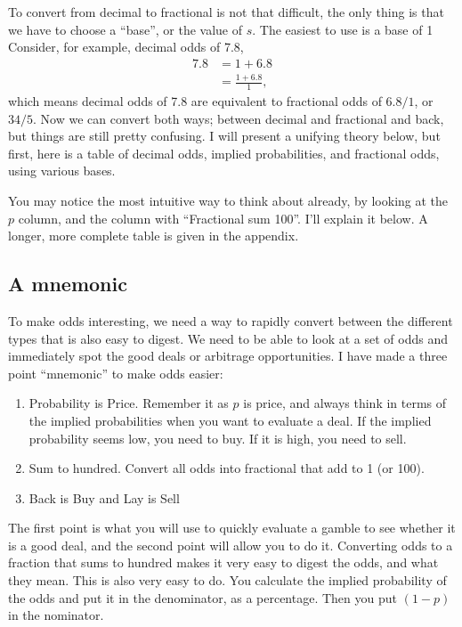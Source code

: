 \documentclass[a4paper]{article}
\begin{document}
To convert from decimal to fractional is not that difficult, the only thing is that we have to choose a ``base'', or the value of $s$.
The easiest to use is a base of 1
Consider, for example, decimal odds of 7.8,
\begin{align*}
 7.8 &=  1 + 6.8 \\
     &= \frac{1 + 6.8}{1}
     \text{,}
\end{align*}
which means decimal odds of 7.8 are equivalent to fractional odds of $6.8/1$, or $34/5$.
Now we can convert both ways; between decimal and fractional and back, but things are still pretty confusing.
I will present a unifying theory below, but first, here is a table of decimal odds, implied probabilities, and fractional odds, using various bases.

You may notice the most intuitive way to think about already, by looking at the $p$ column, and the column with ``Fractional sum 100''.
I'll explain it below.
A longer, more complete table is given in the appendix.


\subsection{A mnemonic}
To make odds interesting, we need a way to rapidly convert between the different types that is also easy to digest.
We need to be able to look at a set of odds and immediately spot the good deals or arbitrage opportunities.
I have made a three point ``mnemonic'' to make odds easier:


\begin{enumerate}
 \item Probability is Price.
 Remember it as $p$ is price, and always think in terms of the implied probabilities when you want to evaluate a deal. If the implied probability seems low, you need to buy. If it is high, you need to sell.
 \item Sum to hundred. Convert all odds into fractional that add to 1 (or 100).
 \item Back is Buy and Lay is Sell
\end{enumerate}

The first point is what you will use to quickly evaluate a gamble to see whether it is a good deal, and the second point will allow you to do it.
Converting odds to a fraction that sums to hundred makes it very easy to digest the odds, and what they mean.
This is also very easy to do. You calculate the implied probability of the odds and put it in the denominator, as a percentage.
Then you put $(1-p)$ in the nominator.
\end{document}
